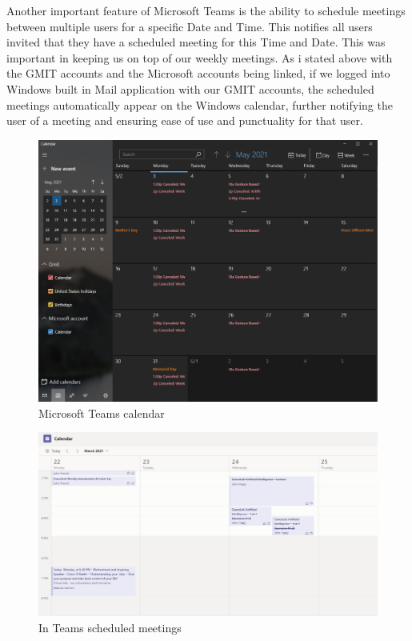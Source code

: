 Another important feature of Microsoft Teams is the ability to schedule meetings between multiple users for a specific Date and Time. This notifies all users invited that they have a scheduled meeting for this Time and Date. This was important in keeping us on top of our weekly meetings. As i stated above with the GMIT accounts and the Microsoft accounts being linked, if we logged into Windows built in Mail application with our GMIT accounts, the scheduled meetings automatically appear on the Windows calendar, further notifying the user of a meeting and ensuring ease of use and punctuality for that user.
\begin{figure}[ht]
\renewcommand\thefigure{3.22}
\centering
\includegraphics[scale=0.4]{img/Caledar.PNG}
\caption{Microsoft Teams calendar}
\label{TeamsCalendar}
\end{figure}


\begin{figure}[ht]
\renewcommand\thefigure{3.23}
\centering
\includegraphics[scale=0.4]{img/TCalendar.PNG}
\caption{In Teams scheduled meetings}
\label{TeamsMeetings}
\end{figure}


